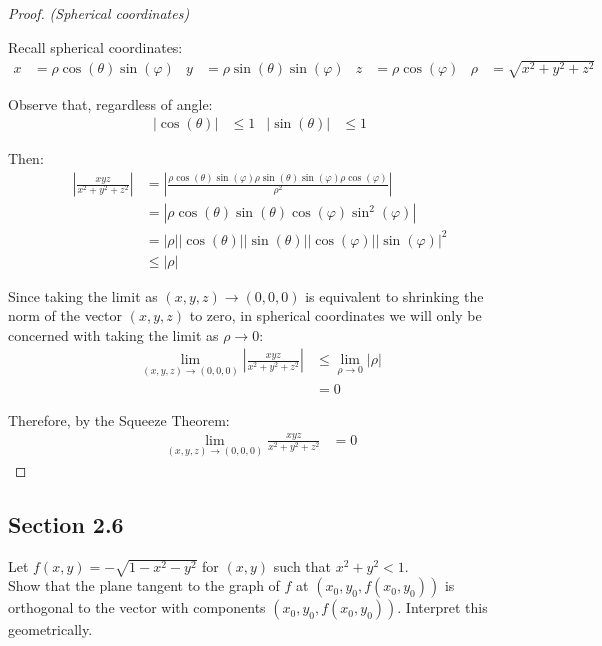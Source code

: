 \begin{proof}
\textit{(Spherical coordinates)} 

Recall spherical coordinates:
\begin{align}
    x &= \rho \cos(\theta) \sin(\varphi) & y &= \rho \sin(\theta) \sin(\varphi) & z &= \rho \cos(\varphi) & \rho &= \sqrt{x^2 + y^2 + z^2}
\end{align}

Observe that, regardless of angle:
\begin{align}
    |\cos{(\theta)}| &\leq 1 & |\sin{(\theta)}| &\leq 1
\end{align}

Then:
\begin{align*}
    \left|\frac{xyz}{x^2 + y^2 + z^2}\right| &= \left|\frac{\rho \cos(\theta) \sin(\varphi)\rho \sin(\theta) \sin(\varphi)\rho \cos(\varphi)}{\rho^2}\right| \\
    &= \left|\rho \cos(\theta) \sin(\theta) \cos(\varphi) \sin^2(\varphi)\right| \\
    &= \left|\rho\right| \left|\cos(\theta)\right| \left|\sin(\theta)\right| \left|\cos(\varphi)\right| \left|\sin(\varphi)\right|^2 \\
    &\leq \left|\rho\right| 
\end{align*}

Since taking the limit as \((x, y, z) \rightarrow (0, 0, 0)\) is equivalent to shrinking the norm of the vector \((x, y, z)\) to zero, in spherical coordinates we will only be concerned with taking the limit as \(\rho \rightarrow 0\):
    \begin{align*}
        \lim_{(x, y, z) \rightarrow (0, 0, 0)} \left|\frac{xyz}{x^2 + y^2 + z^2}\right| &\leq \lim_{\rho \rightarrow 0} |\rho| \\
        &= 0
    \end{align*}
    
Therefore, by the Squeeze Theorem:
\begin{align}
        \lim_{(x, y, z) \rightarrow (0, 0, 0)} \frac{xyz}{x^2 + y^2 + z^2} &= 0
    \end{align}
\end{proof}

\subsection{Section 2.6}

\begin{tcolorbox}[
        title={Problem 16},
        valign=center,
        nobeforeafter,
        colframe=gray!95!black
    ]
Let \(f(x, y) = -\sqrt{1 - x^2 - y^2}\) for \((x, y)\) such that \(x^2 + y^2 < 1\). \\

Show that the plane tangent to the graph of \(f\) at \((x_0, y_0, f(x_0, y_0))\) is orthogonal to the vector with components \((x_0, y_0, f(x_0, y_0))\). Interpret this geometrically.
\end{tcolorbox}


